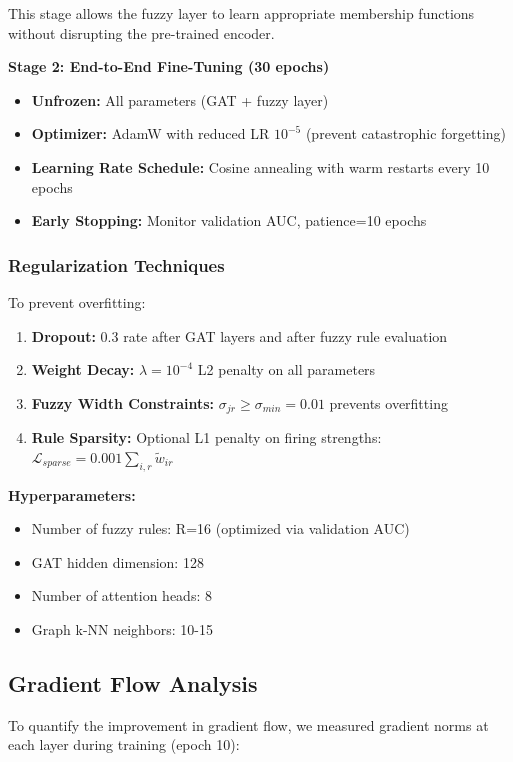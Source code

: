\documentclass[conference]{IEEEtran}
\begin{document}
This stage allows the fuzzy layer to learn appropriate membership functions without disrupting the pre-trained encoder.

\textbf{Stage 2: End-to-End Fine-Tuning (30 epochs)}
\begin{itemize}
\item \textbf{Unfrozen:} All parameters (GAT + fuzzy layer)
\item \textbf{Optimizer:} AdamW with reduced LR $10^{-5}$ (prevent catastrophic forgetting)
\item \textbf{Learning Rate Schedule:} Cosine annealing with warm restarts every 10 epochs
\item \textbf{Early Stopping:} Monitor validation AUC, patience=10 epochs
\end{itemize}

\subsubsection{Regularization Techniques}

To prevent overfitting:
\begin{enumerate}
\item \textbf{Dropout:} 0.3 rate after GAT layers and after fuzzy rule evaluation
\item \textbf{Weight Decay:} $\lambda=10^{-4}$ L2 penalty on all parameters
\item \textbf{Fuzzy Width Constraints:} $\sigma_{jr} \geq \sigma_{min}=0.01$ prevents overfitting
\item \textbf{Rule Sparsity:} Optional L1 penalty on firing strengths: $\mathcal{L}_{sparse} = 0.001\sum_{i,r} \tilde{w}_{ir}$
\end{enumerate}

\textbf{Hyperparameters:}
\begin{itemize}
    \item Number of fuzzy rules: R=16 (optimized via validation AUC)
    \item GAT hidden dimension: 128
    \item Number of attention heads: 8
    \item Graph k-NN neighbors: 10-15
\end{itemize}

\subsection{Gradient Flow Analysis}

To quantify the improvement in gradient flow, we measured gradient norms at each layer during training (epoch 10):
\end{document}
